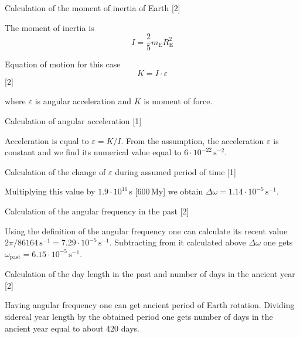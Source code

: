 Calculation of the moment of inertia of Earth \hfill[2]

The moment of inertia is
\[ I = \frac{2}{5} m_{\mathrm{E}} R_{\mathrm{E}}^2 \]

Equation of motion for this case
\[ K = I\cdot\varepsilon \]
\hfill[2]

where $\varepsilon$ is angular acceleration and $K$ is moment of force.

Calculation of angular acceleration \hfill[1]

Acceleration is equal to $\varepsilon = K/I$. From the assumption, the
acceleration $\varepsilon$ is constant and we find its numerical value equal
to $6\cdot10^{-22}\,\mathrm{s}^{-2}$. %

Calculation of the change of $\varepsilon$ during assumed period of time %
\hfill[1]

Multiplying this value by $1.9\cdot10^{16}$\,s [600\,My] we obtain
$\Delta\omega = 1.14\cdot10^{-5}\,\mathrm{s}^{-1}$.

Calculation of the angular frequency in the past \hfill[2]

Using the definition of the angular frequency one can calculate its recent
value $2\pi/86164\,\mathrm{s}^{-1} = 7.29\cdot10^{-5}\,\mathrm{s}^{-1}$.
Subtracting from it calculated above $\Delta\omega$ one gets
$\omega_{\mathrm{past}} = 6.15\cdot10^{-5}\,\mathrm{s}^{-1}$.

Calculation of the day length in the past and number of days in the ancient
year \hfill[2]

Having angular frequency one can get ancient period of Earth rotation.
Dividing sidereal year length by the obtained period one gets number of days
in the ancient year equal to about 420 days.
